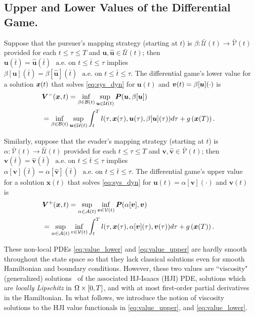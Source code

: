 \subsection{Upper and Lower Values of the Differential Game.}

\noindent Suppose that the pursuer's mapping strategy (starting at $t$) is $\beta: \mathcal{\bar{U}}({t}) \rightarrow \mathcal{\bar{V}}({t})$ provided for each $t \le \tau \le T$ and $\bm{u}, \hat{\bm{u}} \in \mathcal{\bar{U}}({t})$; then $\bm{u}(\bar{t}) = \hat{\bm{u}}(\bar{t}) \,\, \text{ a.e. on } t \le \bar{t}  \le \tau$ implies $\beta[\bm{u}](\bar{t}) = \beta[\hat{\bm{u}}](\bar{t}) \,\, \text{ a.e. on } t \le \bar{t}  \le \tau$.
%
The differential game's lower value for a solution $\bm{x}(t)$ that solves \eqref{eq:sys_dyn} for $\bm{u}(t)$ and $\bm{v}(t) = \beta[\bm{u}](\cdot)$ is 
%
\begin{align}
	&\lowervalue(\state, t) = \inf_{\beta \in \mathcal{B}(t)} \sup_{\bm{u} \in \mathcal{U}(t)} \bm{P}(\bm{u}, \beta[\bm{u}]) \nonumber \\
	&=  \inf_{\beta \in \mathcal{B}(t)} \sup_{\bm{u} \in \mathcal{U}(t)} %
	\int_{t}^{T} l(\tau, \bm{x}(\tau), \bm{u}(\tau), \beta[\bm{u}](\tau)) d\tau + g\left(\bm{x}(T)\right). %
	\label{eq:value_lower}
\end{align}

Similarly, suppose that  the evader's mapping strategy (starting at $t$) is $\alpha: \mathcal{\bar{V}}({t}) \rightarrow \mathcal{\bar{U}}({t})$ provided for each $t \le \tau \le T$ and $\bm{v}, \hat{\bm{v}} \in \mathcal{\bar{V}}({t})$; then  $\bm{v}(\bar{t}) = \hat{\bm{v}}(\bar{t}) \,\, \text{ a.e. on } t \le \bar{t}  \le \tau$ implies $\alpha[\bm{v}](\bar{t}) = \alpha[\hat{\bm{v}}](\bar{t}) \,\, \text{ a.e. on } t \le \bar{t}  \le \tau$. The differential game's upper value for a solution $\bm{x}(t)$ that solves \eqref{eq:sys_dyn} for $\bm{u}(t) = \alpha[\bm{v}](\cdot)$ and $\bm{v}(t)$  is 
%
\begin{align}
	&\uppervalue(\state, t) = \sup_{\alpha \in \mathcal{A}(t)} \inf_{\bm{v} \in \mathcal{V}(t)}  \bm{P}(\alpha[\bm{v}], \bm{v}) \nonumber \\
	&=  \sup_{\alpha \in \mathcal{A}(t)} \inf_{v \in \mathcal{V}(t)} %
	\int_{t}^{T}l(\tau, \bm{x}(\tau), \alpha[\bm{v}](\tau), \bm{v}(\tau)) d\tau  + g\left(\bm{x}(T)\right).
	\label{eq:value_upper}
\end{align}

These non-local PDEs \ie \eqref{eq:value_lower} and \eqref{eq:value_upper} are hardly smooth throughout the state space so that they  lack classical solutions even for smooth Hamiltonian and boundary conditions. However, these two values are ``viscosity" (generalized)  solutions~\cite{Lions1982, Crandall1983viscosity} of the associated HJ-Isaacs (HJI) PDE, \ie solutions which are \textit{locally Lipschitz} in $\Omega \times [0, T]$, and with at most first-order partial derivatives in the Hamiltonian. In what follows, we introduce the notion of viscosity solutions to the HJI value functionals in \eqref{eq:value_upper}, and \eqref{eq:value_lower}.



